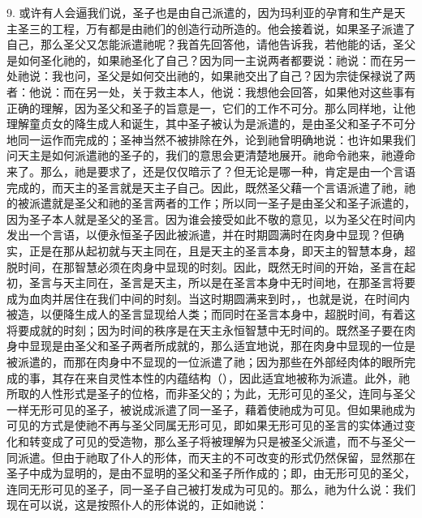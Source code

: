 9. 或许有人会逼我们说，圣子也是由自己派遣的，因为玛利亚的孕育和生产是天主圣三的工程，万有都是由祂们的创造行动所造的。他会接着说，如果圣子派遣了自己，那么圣父又怎能派遣祂呢？我首先回答他，请他告诉我，若他能的话，圣父是如何圣化祂的，如果祂圣化了自己？因为同一主说两者都要说：祂说：而在另一处祂说：我也问，圣父是如何交出祂的，如果祂交出了自己？因为宗徒保禄说了两者：他说：而在另一处，关于救主本人，他说：我想他会回答，如果他对这些事有正确的理解，因为圣父和圣子的旨意是一，它们的工作不可分。那么同样地，让他理解童贞女的降生成人和诞生，其中圣子被认为是派遣的，是由圣父和圣子不可分地同一运作而完成的；圣神当然不被排除在外，论到祂曾明确地说：也许如果我们问天主是如何派遣祂的圣子的，我们的意思会更清楚地展开。祂命令祂来，祂遵命来了。那么，祂是要求了，还是仅仅暗示了？但无论是哪一种，肯定是由一个言语完成的，而天主的圣言就是天主子自己。因此，既然圣父藉一个言语派遣了祂，祂的被派遣就是圣父和祂的圣言两者的工作；所以同一圣子是由圣父和圣子派遣的，因为圣子本人就是圣父的圣言。因为谁会接受如此不敬的意见，以为圣父在时间内发出一个言语，以便永恒圣子因此被派遣，并在时期圆满时在肉身中显现？但确实，正是在那从起初就与天主同在，且是天主的圣言本身，即天主的智慧本身，超脱时间，在那智慧必须在肉身中显现的时刻。因此，既然无时间的开始，圣言在起初，圣言与天主同在，圣言是天主，所以是在圣言本身中无时间地，在那圣言将要成为血肉并居住在我们中间的时刻。当这时期圆满来到时，，也就是说，在时间内被造，以便降生成人的圣言显现给人类；而同时在圣言本身中，超脱时间，有着这将要成就的时刻；因为时间的秩序是在天主永恒智慧中无时间的。既然圣子要在肉身中显现是由圣父和圣子两者所成就的，那么适宜地说，那在肉身中显现的一位是被派遣的，而那在肉身中不显现的一位派遣了祂；因为那些在外部经肉体的眼所完成的事，其存在来自灵性本性的内蕴结构（），因此适宜地被称为派遣。此外，祂所取的人性形式是圣子的位格，而非圣父的；为此，无形可见的圣父，连同与圣父一样无形可见的圣子，被说成派遣了同一圣子，藉着使祂成为可见。但如果祂成为可见的方式是使祂不再与圣父同属无形可见，即如果无形可见的圣言的实体通过变化和转变成了可见的受造物，那么圣子将被理解为只是被圣父派遣，而不与圣父一同派遣。但由于祂取了仆人的形体，而天主的不可改变的形式仍然保留，显然那在圣子中成为显明的，是由不显明的圣父和圣子所作成的；即，由无形可见的圣父，连同无形可见的圣子，同一圣子自己被打发成为可见的。那么，祂为什么说：我们现在可以说，这是按照仆人的形体说的，正如祂说：\par

